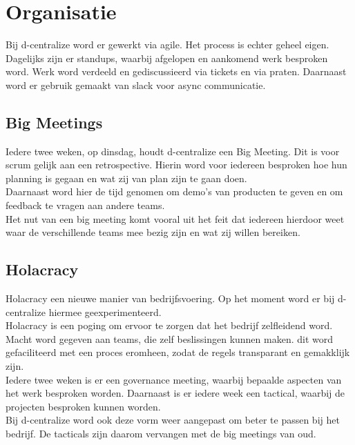 \section{Organisatie}

Bij d-centralize word er gewerkt via agile. Het process is echter geheel eigen. Dagelijks zijn er standups, waarbij afgelopen en aankomend werk besproken word. Werk word verdeeld en gediscussieerd via tickets en via praten. Daarnaast word er gebruik gemaakt van slack voor async communicatie. 

\subsection{Big Meetings}

Iedere twee weken, op dinsdag, houdt d-centralize een Big Meeting. Dit is voor scrum gelijk aan een retrospective. Hierin word voor iedereen besproken hoe hun planning is gegaan en wat zij van plan zijn te gaan doen. \\

Daarnaast word hier de tijd genomen om demo's van producten te geven en om feedback te vragen aan andere teams. \\

Het nut van een big meeting komt vooral uit het feit dat iedereen hierdoor weet waar de verschillende teams mee bezig zijn en wat zij willen bereiken.

\subsection{Holacracy}

Holacracy een nieuwe manier van bedrijfsvoering. Op het moment word er bij d-centralize hiermee geexperimenteerd. \\ 

Holacracy is een poging om ervoor te zorgen dat het bedrijf zelfleidend word. Macht word gegeven aan teams, die zelf beslissingen kunnen maken. dit word gefaciliteerd met een proces eromheen, zodat de regels transparant en gemakklijk zijn. \\

Iedere twee weken is er een governance meeting, waarbij bepaalde aspecten van het werk besproken worden. Daarnaast is er iedere week een tactical, waarbij de projecten besproken kunnen worden. \\

Bij d-centralize word ook deze vorm weer aangepast om beter te passen bij het bedrijf. De tacticals zijn daarom vervangen met de big meetings van oud.